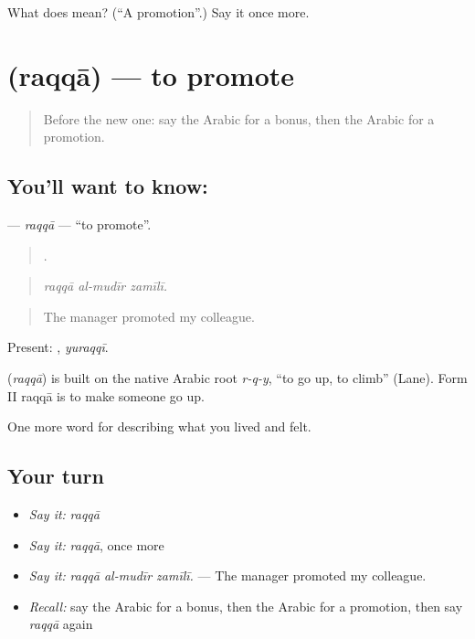 \begin{tcolorbox}[breakable,colback=teal!4,colframe=teal!35!black,title={Before you move on}]
What does  mean? (\textquotedblleft{}A promotion\textquotedblright{}.) Say it once more.
\end{tcolorbox}
\section[\texorpdfstring{\ar{رقى} (raqqā)}{رقى (raqqā)}]{ (raqqā) — to promote}

\label{lesson:AR-C521-raqqa}



\begin{quote}
Before the new one: say the Arabic for a bonus, then the Arabic for a promotion.
\end{quote}

\subsection*{You'll want to know: }
\textbf{} — \emph{raqqā} — \textquotedblleft{}to promote\textquotedblright{}.

\begin{quote}
  .
\end{quote}

\begin{quote}
\emph{raqqā al-mudīr zamīlī.}
\end{quote}

\begin{quote}
The manager promoted my colleague.
\end{quote}

Present: , \emph{yuraqqī}.

\begin{cousinweb}
\textbf{} (\emph{raqqā}) is built on the native Arabic root \emph{r-q-y}, \textquotedblleft{}to go up, to climb\textquotedblright{} (Lane). Form II raqqā is to make someone go up.
\end{cousinweb}

\begin{grammarlens}[title={What you've built}]
One more word for describing what you lived and felt.
\end{grammarlens}

\subsection*{Your turn}
\begin{itemize}
\raggedright
  \item \emph{Say it:} \emph{raqqā}
  \item \emph{Say it:} \emph{raqqā}, once more
  \item \emph{Say it:} \emph{raqqā al-mudīr zamīlī.} — The manager promoted my colleague.
  \item \emph{Recall:} say the Arabic for a bonus, then the Arabic for a promotion, then say \emph{raqqā} again
\end{itemize}

